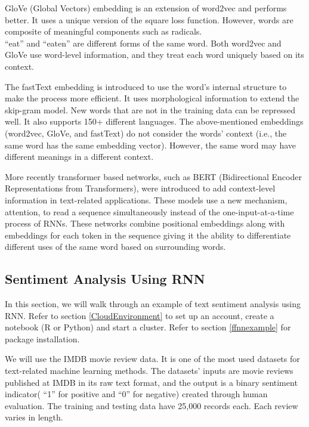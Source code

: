 \documentclass[
  12pt,
]{krantz}
\begin{document}
GloVe (Global Vectors) embedding is an extension of word2vec and performs better. It uses a unique version of the square loss function. However, words are composite of meaningful components such as radicals.\\
``eat'' and ``eaten'' are different forms of the same word. Both word2vec and GloVe use word-level information, and they treat each word uniquely based on its context.

The fastText embedding is introduced to use the word's internal structure to make the process more efficient. It uses morphological information to extend the skip-gram model. New words that are not in the training data can be repressed well. It also supports 150+ different languages. The above-mentioned embeddings (word2vec, GloVe, and fastText) do not consider the words' context (i.e., the same word has the same embedding vector). However, the same word may have different meanings in a different context.

More recently transformer based networks, such as BERT (Bidirectional Encoder Representations from Transformers), were introduced to add context-level information in text-related applications. These models use a new mechanism, attention, to read a sequence simultaneously instead of the one-input-at-a-time process of RNNs. These networks combine positional embeddings along with embeddings for each token in the sequence giving it the ability to differentiate different uses of the same word based on surrounding words.

\hypertarget{rnnexample}{%
\subsection{Sentiment Analysis Using RNN}\label{rnnexample}}

In this section, we will walk through an example of text sentiment analysis using RNN. Refer to section \ref{CloudEnvironment} to set up an account, create a notebook (R or Python) and start a cluster. Refer to section \ref{ffnnexample} for package installation.

We will use the IMDB movie review data. It is one of the most used datasets for text-related machine learning methods. The datasets' inputs are movie reviews published at IMDB in its raw text format, and the output is a binary sentiment indicator( ``1'' for positive and ``0'' for negative) created through human evaluation. The training and testing data have 25,000 records each. Each review varies in length.
\end{document}
